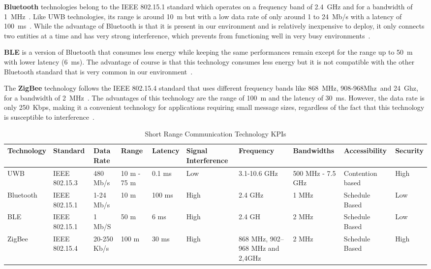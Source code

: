 \textbf{Bluetooth} technologies belong to the IEEE 802.15.1 standard which operates on a frequency band of 2.4~GHz and for a bandwidth of 1~MHz~\cite{anwer_survey_2014,ahangar_survey_2021}. Like UWB technologies, its range is around 10~m but with a low data rate of only around 1 to 24~Mb/s with a latency of 100~ms~\cite{ahangar_survey_2021}. While the advantage of Bluetooth is that it is present in our environment and is relatively inexpensive to deploy, it only connects two entities at a time and has very strong interference, which prevents from functioning well in very busy environments~\cite{wang_networking_2019,bluetooth_bluetooth_2021,akpakwu_survey_2018}. 

\textbf{\acrfull{BLE}} is a version of Bluetooth that consumes less energy while keeping the same performances remain except for the range up to 50~m with lower latency (6~ms). The advantage of course is that this technology consumes less energy but it is not compatible with the other Bluetooth standard that is very common in our environment~\cite{ahangar_survey_2021}. 

The \textbf{ZigBee} technology follows the IEEE 802.15.4 standard that uses different frequency bands like 868~MHz, 908-968Mhz~and 24~Ghz, for a bandwidth of 2~MHz~\cite{ahangar_survey_2021}. The advantages of this technology are the range of 100~m and the latency of 30~ms. However, the data rate is only 250~Kbps, making it a convenient technology for applications requiring small message sizes, regardless of the fact that this technology is susceptible to interference~\cite{anwer_survey_2014,ahangar_survey_2021,shree_novel_2016,selvarajah_zigbee_2008}. 


\begin{table}[ht!]
  \centering
  \caption{Short Range Communication Technology \acrshort{KPI}s}
  \label{tab:short-range-com}
  \begin{tabular}{p{} p{1cm} p{1cm} p{1cm} p{1cm} p{1.5cm} p{1.2cm} p{1.3cm} p{1.4cm} p{1.4cm}}
    \hline
    Technology & Standard & Data Rate & Range & Latency & Signal Interference  & Frequency & Bandwidths & Accessibility & Security\\
    \hline
    UWB &  IEEE 802.15.3  & 480 Mb/s	&   10 m - 75 m	 &  0.1 ms  & Low & 3.1-10.6 GHz	 &500 MHz - 7.5 GHz	 & Contention based	& High\\
   
    Bluetooth  & IEEE 802.15.1	& 1-24 Mb/s	&  10 m&	100 ms  & High &  2.4 GHz	& 1 MHz& 	Schedule Based	& Low\\
	
    BLE  & IEEE 802.15.1	& 1 Mb/S	&  50 m& 6 ms & High&	2.4 GH &	2 MHz 	&Schedule Based&	Low\\

    ZigBee& IEEE 802.15.4	&20-250 Kb/s&	 100 m	&30 ms  &High	&868 MHz, 902–968 MHz and 2,4GHz	&2 MHz & Schedule Based	&High\\
    \hline
  \end{tabular}
\end{table}


